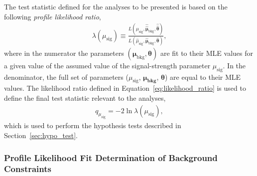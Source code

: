 The test statistic defined for the analyses to be presented is based on the following
\textit{profile likelihood ratio},
\begin{align}
    \lambda(\mu_{\text{sig}}) \equiv
        \frac{
            L(\mu_{\text{sig}}, \hat{\hat{\bm{\mu}}}_{\text{bkg}}, \hat{\hat{\bm{\theta}}})
        }
        {
            L(\hat{\mu}_{\text{sig}}, \hat{\bm{\mu}}_{\text{bkg}}, \hat{\bm{\theta}})
        },
    \label{eq:likelihood_ratio}
\end{align}
where in the numerator the parameters $(\bm{\mu}_{\text{bkg}}, \bm{\theta})$ are fit to their MLE values
for a given value of the assumed value of the signal-strength parameter $\mu_{\text{sig}}$.
In the denominator, the full set of parameters ($\mu_{\text{sig}}$, $\bm{\mu_{\text{bkg}}}$, $\bm{\theta}$) are
equal to their MLE values.
The likelihood ratio defined in Equation~\ref{eq:likelihood_ratio} is used to define the
final test statistic relevant to the analyses,
\begin{align}
    q_{\mu_{\text{sig}}} = - 2 \ln \lambda (\mu_{\text{sig}}),
    \label{eq:pll_test_stat}
\end{align}
which is used to perform the hypothesis tests described in Section~\ref{sec:hypo_test}.

\subsubsection{Profile Likelihood Fit Determination of Background Constraints}

